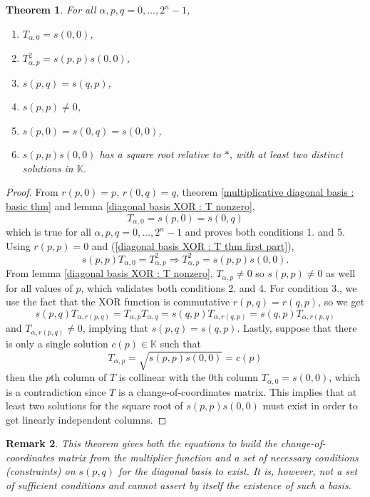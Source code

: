 \documentclass{article}
\newtheorem{theorem}{Theorem}
\newtheorem{remark}[theorem]{Remark}
\begin{document}
\begin{theorem}
    For all $\alpha, p, q = 0,\ldots, 2^n-1$,
    \begin{enumerate}
        \item $T_{\alpha,0} = s(0,0)$,
        \item $T_{\alpha,p}^2 = s(p,p) s(0,0)$,
        \item $s(p,q) = s(q,p)$,
        \item $s(p,p) \neq 0$,
        \item $s(p,0) = s(0,q) = s(0,0)$,
        \item $s(p,p) s(0,0)$ has a square root relative to $*$, with at least two distinct solutions in $\mathbb{K}$.
    \end{enumerate}
\end{theorem}
\begin{proof}
    From $r(p,0) = p$, $r(0,q) = q$, theorem \ref{multiplicative diagonal basis : basic thm} and lemma \ref{diagonal basis XOR : T nonzero},
    \begin{equation}
        \label{diagonal basis XOR : T thm first part}
        T_{\alpha,0} = s(p,0) = s(0,q)
    \end{equation}
    which is true for all $\alpha,p,q = 0,\ldots,2^n-1$ and proves both conditions 1. and 5. Using $r(p,p) = 0$ and (\ref{diagonal basis XOR : T thm first part}),
    $$ s(p,p) T_{\alpha,0} = T_{\alpha,p}^2 \Rightarrow T_{\alpha,p}^2 = s(p,p) s(0,0). $$
    From lemma \ref{diagonal basis XOR : T nonzero}, $T_{\alpha,p} \neq 0$ so $s(p,p) \neq 0$ as well for all values of $p$, which validates both conditions 2. and 4. For condition 3., we use the fact that the XOR function is commutative $r(p,q) = r(q,p)$, so we get
    $$ s(p,q) T_{\alpha, r(p,q)} = T_{\alpha,p} T_{\alpha,q} = s(q,p) T_{\alpha, r(q,p)} = s(q,p) T_{\alpha, r(p,q)} $$
    and $T_{\alpha, r(p,q)} \neq 0$, implying that $s(p,q) = s(q,p)$. Lastly, suppose that there is only a single solution $c(p) \in \mathbb{K}$ such that
    $$ T_{\alpha,p} = \sqrt{s(p,p) s(0,0)} = c(p) $$
    then the $p$th column of $T$ is collinear with the $0$th column $T_{\alpha,0} = s(0,0)$, which is a contradiction since $T$ is a change-of-coordinates matrix. This implies that at least two solutions for the square root of $s(p,p) s(0,0)$ must exist in order to get linearly independent columns.
\end{proof}
\begin{remark}
    This theorem gives both the equations to build the change-of-coordinates matrix from the multiplier function and a set of necessary conditions (constraints) on $s(p,q)$ for the diagonal basis to exist. It is, however, not a set of sufficient conditions and cannot assert by itself the existence of such a basis.
\end{remark}
\end{document}
